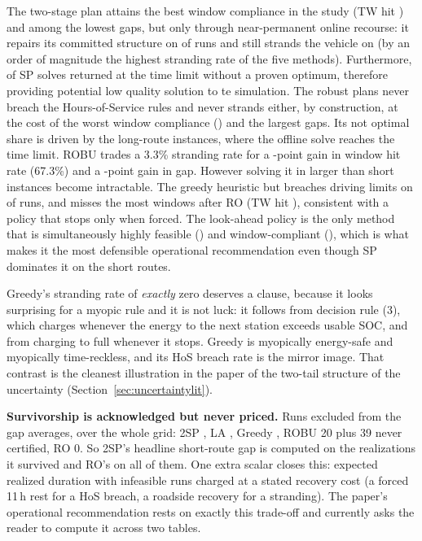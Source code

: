 The two-stage plan attains the best window compliance in the study (TW hit ) and among the lowest gaps, but only through near-permanent online recourse: it repairs its committed structure on  of runs and still strands the vehicle on  (by an order of magnitude the highest stranding rate of the five methods). Furthermore,  of SP solves returned at the time limit without a proven optimum,  therefore providing potential low quality solution to te simulation.
The robust plans never breach the Hours-of-Service rules and never strands either, by construction, at the cost of the worst window compliance () and the largest gaps. Its  not optimal share is driven by the long-route instances, where the offline solve reaches the time limit.
ROBU trades a 3.3\% stranding rate for a -point gain in window hit rate (67.3\%) and a -point gain in gap. However solving it in larger than short instances become intractable. 
The greedy heuristic  but breaches driving limits on  of runs, and misses the most windows after RO (TW hit ), consistent with a policy that stops only when forced.
The look-ahead policy is the only method that is simultaneously highly feasible () and window-compliant (), which is what makes it the most defensible operational recommendation even though SP dominates it on the short routes.

\begin{acmt}
Greedy's stranding rate of \emph{exactly} zero deserves a clause, because it looks
surprising for a myopic rule and it is not luck: it follows from decision rule (3),
which charges whenever the energy to the next station exceeds usable SOC, and
from charging to full whenever it stops. Greedy is myopically energy-safe and
myopically time-reckless, and its  HoS breach rate is the mirror
image. That contrast is the cleanest illustration in the paper of the two-tail
structure of the uncertainty (Section~\ref{sec:uncertaintylit}).
\end{acmt}

\begin{atodo}
\textbf{Survivorship is acknowledged but never priced.} Runs excluded from the
gap averages, over the whole grid: 2SP , LA , Greedy
, ROBU 20 plus 39 never certified, RO 0. So 2SP's headline short-route
gap is computed on the realizations it survived and RO's on all of them. One
extra scalar closes this: expected realized duration with infeasible runs charged
at a stated recovery cost (a forced 11\,h rest for a HoS breach, a roadside
recovery for a stranding). The paper's operational recommendation rests on
exactly this trade-off and currently asks the reader to compute it across two
tables.
\end{atodo}

